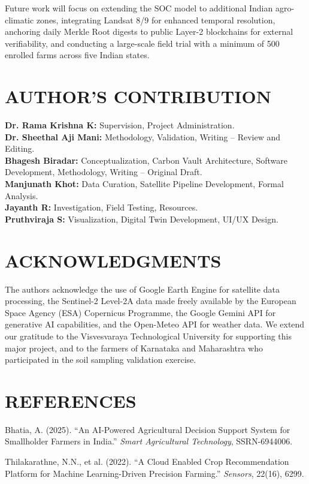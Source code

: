 \documentclass[10pt,a4paper]{article}
\begin{document}
Future work will focus on extending the SOC model to additional Indian agro-climatic zones, integrating Landsat 8/9 for enhanced temporal resolution, anchoring daily Merkle Root digests to public Layer-2 blockchains for external verifiability, and conducting a large-scale field trial with a minimum of 500 enrolled farms across five Indian states.

\section{AUTHOR'S CONTRIBUTION}
\textbf{Dr. Rama Krishna K:} Supervision, Project Administration. \\
\textbf{Dr. Sheethal Aji Mani:} Methodology, Validation, Writing -- Review and Editing. \\
\textbf{Bhagesh Biradar:} Conceptualization, Carbon Vault Architecture, Software Development, Methodology, Writing -- Original Draft. \\
\textbf{Manjunath Khot:} Data Curation, Satellite Pipeline Development, Formal Analysis. \\
\textbf{Jayanth R:} Investigation, Field Testing, Resources. \\
\textbf{Pruthviraja S:} Visualization, Digital Twin Development, UI/UX Design.

\section{ACKNOWLEDGMENTS}
The authors acknowledge the use of Google Earth Engine for satellite data processing, the Sentinel-2 Level-2A data made freely available by the European Space Agency (ESA) Copernicus Programme, the Google Gemini API for generative AI capabilities, and the Open-Meteo API for weather data. We extend our gratitude to the Visvesvaraya Technological University for supporting this major project, and to the farmers of Karnataka and Maharashtra who participated in the soil sampling validation exercise.

\section{REFERENCES}
\noindent [1] Bhatia, A. (2025). ``An AI-Powered Agricultural Decision Support System for Smallholder Farmers in India.'' \textit{Smart Agricultural Technology}, SSRN-6944006.

\noindent [2] Thilakarathne, N.N., et al. (2022). ``A Cloud Enabled Crop Recommendation Platform for Machine Learning-Driven Precision Farming.'' \textit{Sensors}, 22(16), 6299.
\end{document}
